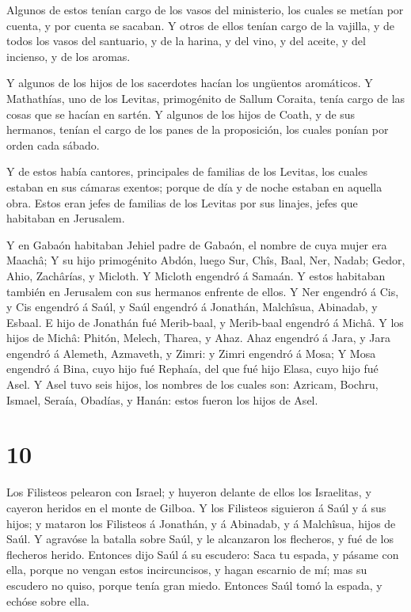  Algunos de estos tenían cargo de los vasos del ministerio,
los cuales se metían por cuenta, y por cuenta se sacaban. 
Y otros de ellos tenían cargo de la vajilla, y de todos los vasos del
santuario, y de la harina, y del vino, y del aceite, y del incienso, y
de los aromas.

 Y algunos de los hijos de los sacerdotes hacían los
ungüentos aromáticos.  Y Mathathías, uno de los Levitas,
primogénito de Sallum Coraita, tenía cargo de las cosas que se hacían en
sartén.  Y algunos de los hijos de Coath, y de sus
hermanos, tenían el cargo de los panes de la proposición, los cuales
ponían por orden cada sábado.

 Y de estos había cantores, principales de familias de los
Levitas, los cuales estaban en sus cámaras exentos; porque de día y de
noche estaban en aquella obra.  Estos eran jefes de
familias de los Levitas por sus linajes, jefes que habitaban en
Jerusalem.

 Y en Gabaón habitaban Jehiel padre de Gabaón, el nombre de
cuya mujer era Maachâ;  Y su hijo primogénito Abdón, luego
Sur, Chîs, Baal, Ner, Nadab;  Gedor, Ahio, Zachârías, y
Micloth.  Y Micloth engendró á Samaán. Y estos habitaban
también en Jerusalem con sus hermanos enfrente de ellos.  Y
Ner engendró á Cis, y Cis engendró á Saúl, y Saúl engendró á Jonathán,
Malchîsua, Abinadab, y Esbaal.  E hijo de Jonathán fué
Merib-baal, y Merib-baal engendró á Michâ.  Y los hijos de
Michâ: Phitón, Melech, Tharea, y Ahaz.  Ahaz engendró á
Jara, y Jara engendró á Alemeth, Azmaveth, y Zimri: y Zimri engendró á
Mosa;  Y Mosa engendró á Bina, cuyo hijo fué Rephaía, del
que fué hijo Elasa, cuyo hijo fué Asel.  Y Asel tuvo seis
hijos, los nombres de los cuales son: Azricam, Bochru, Ismael, Seraía,
Obadías, y Hanán: estos fueron los hijos de Asel.

\hypertarget{section-9}{%
\section{10}\label{section-9}}

 Los Filisteos pelearon con Israel; y huyeron delante de
ellos los Israelitas, y cayeron heridos en el monte de Gilboa.
 Y los Filisteos siguieron á Saúl y á sus hijos; y mataron
los Filisteos á Jonathán, y á Abinadab, y á Malchîsua, hijos de Saúl.
 Y agravóse la batalla sobre Saúl, y le alcanzaron los
flecheros, y fué de los flecheros herido.  Entonces dijo
Saúl á su escudero: Saca tu espada, y pásame con ella, porque no vengan
estos incircuncisos, y hagan escarnio de mí; mas su escudero no quiso,
porque tenía gran miedo. Entonces Saúl tomó la espada, y echóse sobre
ella.

